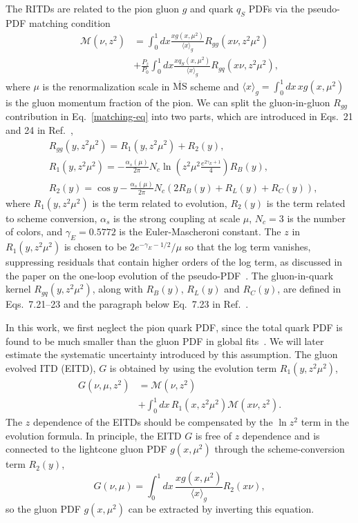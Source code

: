 The RITDs are related to the pion gluon $g$ and quark $q_S$ PDFs via the pseudo-PDF matching condition~\cite{Balitsky:2019krf}
%
\begin{align}
\mathscr{M}(\nu,z^2)&=\int_0^1 dx \frac{xg(x,\mu^2)}{\langle x \rangle_g}R_{gg}(x\nu,z^2\mu^2) \nonumber \\
&+\frac{P_z}{P_0}\int_0^1 dx \frac{xq_S(x,\mu^2)}{\langle x \rangle_g}R_{gq}(x\nu,z^2\mu^2),
\label{matching-eq}
\end{align}
%
where $\mu$ is the renormalization scale in $\overline{\text{MS}}$ scheme
and $\langle x \rangle_g=\int_0^1 dx \, x g(x,\mu^2)$ is the gluon momentum fraction of the pion.
We can split the gluon-in-gluon $R_{gg}$ contribution in Eq.~\ref{matching-eq} into two parts, which are introduced in Eqs.~21 and 24 in Ref.~\cite{Radyushkin:2018cvn},
%
\begin{align}
&R_{gg}(y,z^2\mu^2)=R_1(y,z^2\mu^2)+R_2(y), \label{matching-kernel}\\
&R_1(y,z^2\mu^2)=-\frac{\alpha_s(\mu)}{2\pi}N_c\ln\left(z^2\mu^2\frac{e^{2\gamma_E+1}}{4}\right)R_B(y), \label{matching-evolve}\\
&R_2(y)=\cos y-\frac{\alpha_s(\mu)}{2\pi}N_c\left( 2R_B(y)+R_L(y)+R_C(y)\right),
\label{matching-scheme}
\end{align}
%
where $R_1(y,z^2\mu^2)$ is the term related to evolution,
$R_2(y)$
is the term related to scheme conversion,
$\alpha_s$ is the strong coupling at scale $\mu$,
$N_c=3$ is the number of colors,
and $\gamma_E=0.5772$ is the Euler-Mascheroni constant.
%
The $z$ in $R_1(y,z^2\mu^2)$ is chosen to be $2e^{-\gamma_E-1/2}/\mu$ so that the log term vanishes, suppressing residuals that contain higher orders of the log term, as discussed in the paper on the one-loop evolution of the pseudo-PDF~\cite{Radyushkin:2018cvn}.
%
The gluon-in-quark kernel $R_{gq}(y,z^2\mu^2)$, along with $R_B(y)$, $R_L(y)$ and $R_C(y)$, are defined in Eqs.~7.21--23 and the paragraph below Eq.~7.23 in Ref.~\cite{Balitsky:2019krf}.

In this work, we first neglect the pion quark PDF, since the total quark PDF is found to be much smaller than the gluon PDF in global fits~\cite{Barry:2018ort,Novikov:2020snp}.
We will later estimate the systematic uncertainty introduced by this assumption.
The gluon evolved ITD (EITD), $G$ is obtained by using the evolution term $R_1(y,z^2\mu^2)$,
%
\begin{align}
G(\nu,\mu,z^2)&=\mathscr{M}(\nu,z^2)\nonumber\\
&+\int^1_0 dx\, R_1(x,z^2\mu^2)\mathscr{M}(x\nu,z^2).
\label{evolution}
\end{align}
%
The $z$ dependence of the EITDs should be compensated by the $\ln{z^2}$ term in the evolution formula.
In principle, the EITD $G$ is free of $z$ dependence and is connected to the lightcone gluon PDF $g(x,\mu^2)$ through the scheme-conversion term $R_2(y)$,
%
\begin{equation}
G(\nu,\mu)=\int_0^1 dx\, \frac{xg(x,\mu^2)}{\langle x \rangle_g} R_2(x\nu),
\label{conversion}
\end{equation}
%
so the gluon PDF $g(x,\mu^2)$ can be extracted by inverting this equation.

